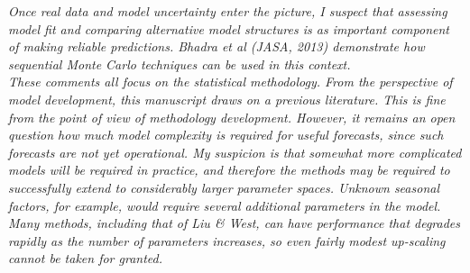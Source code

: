 \documentclass{article}
\begin{document}
\noindent \emph{Once real data and model uncertainty enter the picture, I suspect that assessing model fit and comparing alternative model structures is as important component of making reliable predictions. Bhadra et al (JASA, 2013) demonstrate how sequential Monte Carlo techniques can be used in this context.} \\

\noindent \emph{These comments all focus on the statistical methodology. From the perspective of model development, this manuscript draws on a previous literature. This is fine from the point of view of methodology development. However, it remains an open question how much model complexity is required for useful forecasts, since such forecasts are not yet operational. My suspicion is that somewhat more complicated models will be required in practice, and therefore the methods may be required to successfully extend to considerably larger parameter spaces. Unknown seasonal factors, for example, would require several additional parameters in the model. Many methods, including that of Liu \& West, can have performance that degrades rapidly as the number of parameters increases, so even fairly modest up-scaling cannot be taken for granted.} \\
\end{document}
